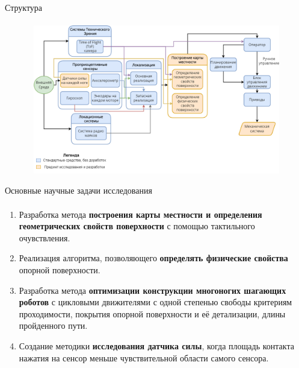 \documentclass[aspectratio=169,xcolor=table,10pt]{beamer}
\begin{document}
\begin{frame}[t]{Структура}
    \framesubtitle{}
    \begin{figure}[H]
        \centering\includegraphics[height=6.5cm,width=1\textwidth,keepaspectratio]{main_diag_hor.png}
        \label{fig:main_diag_hor.png}
    \end{figure}
\end{frame}

\begin{frame}[t]{Основные научные задачи исследования}
    \framesubtitle{}
    \begin{enumerate}
        \item  Разработка метода \textbf{построения карты местности и определения геометрических свойств поверхности} с помощью тактильного очувствления.
        \item Реализация алгоритма, позволяющего \textbf{определять физические свойства} опорной поверхности.
        \item Разработка метода \textbf{оптимизации конструкции многоногих шагающих роботов} с цикловыми движителями с одной степенью свободы критериям проходимости, покрытия опорной поверхности и её детализации, длины пройденного пути.
        \item Создание методики \textbf{исследования датчика силы}, когда площадь контакта нажатия на сенсор меньше чувствительной области самого сенсора.
    \end{enumerate}
\end{frame}
\end{document}
